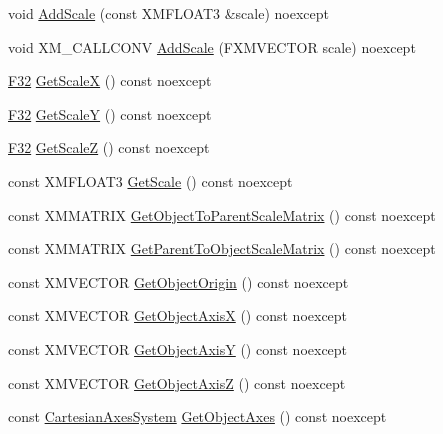 \begin{DoxyCompactItemize}
\item 
void \hyperlink{classmage_1_1_transform_aea10d09564f098ed72e08e6d5446c1cb}{Add\+Scale} (const X\+M\+F\+L\+O\+A\+T3 \&scale) noexcept
\item 
void X\+M\+\_\+\+C\+A\+L\+L\+C\+O\+NV \hyperlink{classmage_1_1_transform_a2e424087adc2332bb254dc6162202866}{Add\+Scale} (F\+X\+M\+V\+E\+C\+T\+OR scale) noexcept
\item 
\hyperlink{namespacemage_aa97e833b45f06d60a0a9c4fc22ae02c0}{F32} \hyperlink{classmage_1_1_transform_a86eff370d6cb37a7aa5f7d78d4cf3cf4}{Get\+ScaleX} () const noexcept
\item 
\hyperlink{namespacemage_aa97e833b45f06d60a0a9c4fc22ae02c0}{F32} \hyperlink{classmage_1_1_transform_a17bd579657e31fbdc1eacec0836140c5}{Get\+ScaleY} () const noexcept
\item 
\hyperlink{namespacemage_aa97e833b45f06d60a0a9c4fc22ae02c0}{F32} \hyperlink{classmage_1_1_transform_aa7ba1aa16161ec656b2828c2433f6dbd}{Get\+ScaleZ} () const noexcept
\item 
const X\+M\+F\+L\+O\+A\+T3 \hyperlink{classmage_1_1_transform_a0f63b2450b9ecb066bf4e34707d9148e}{Get\+Scale} () const noexcept
\item 
const X\+M\+M\+A\+T\+R\+IX \hyperlink{classmage_1_1_transform_a27c7ed867751be11143d6eb9b0578d52}{Get\+Object\+To\+Parent\+Scale\+Matrix} () const noexcept
\item 
const X\+M\+M\+A\+T\+R\+IX \hyperlink{classmage_1_1_transform_ab6da631ec399eb3b88b67e438dd0c002}{Get\+Parent\+To\+Object\+Scale\+Matrix} () const noexcept
\item 
const X\+M\+V\+E\+C\+T\+OR \hyperlink{classmage_1_1_transform_a138b6649becd0f12b36a7db44e46ce31}{Get\+Object\+Origin} () const noexcept
\item 
const X\+M\+V\+E\+C\+T\+OR \hyperlink{classmage_1_1_transform_a9f1bb95655238cd91ceae487d49ae6c2}{Get\+Object\+AxisX} () const noexcept
\item 
const X\+M\+V\+E\+C\+T\+OR \hyperlink{classmage_1_1_transform_a8638ea8b26dcd32508c267151c3adcfe}{Get\+Object\+AxisY} () const noexcept
\item 
const X\+M\+V\+E\+C\+T\+OR \hyperlink{classmage_1_1_transform_a0f1249835596278a430c63d74a86906a}{Get\+Object\+AxisZ} () const noexcept
\item 
const \hyperlink{structmage_1_1_cartesian_axes_system}{Cartesian\+Axes\+System} \hyperlink{classmage_1_1_transform_a71f590385c153fd0a9dd15af4b8a4bc7}{Get\+Object\+Axes} () const noexcept
\item 

\end{DoxyCompactItemize}
